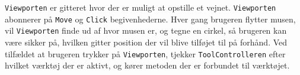 \vspace{5mm}

\texttt{Viewporten} er gitteret hvor der er muligt at opstille et vejnet. \texttt{Viewporten} abonnerer på \texttt{Move} og \texttt{Click} begivenhederne. Hver gang brugeren flytter musen, vil \texttt{Viewporten} finde ud af hvor musen er, og tegne en cirkel, så brugeren kan være sikker på, hvilken gitter position der vil blive tilføjet til på forhånd. Ved tilfældet at brugeren trykker på \texttt{Viewporten}, tjekker \texttt{ToolControlleren} efter hvilket værktøj der er aktivt, og kører metoden der er forbundet til værktøjet.